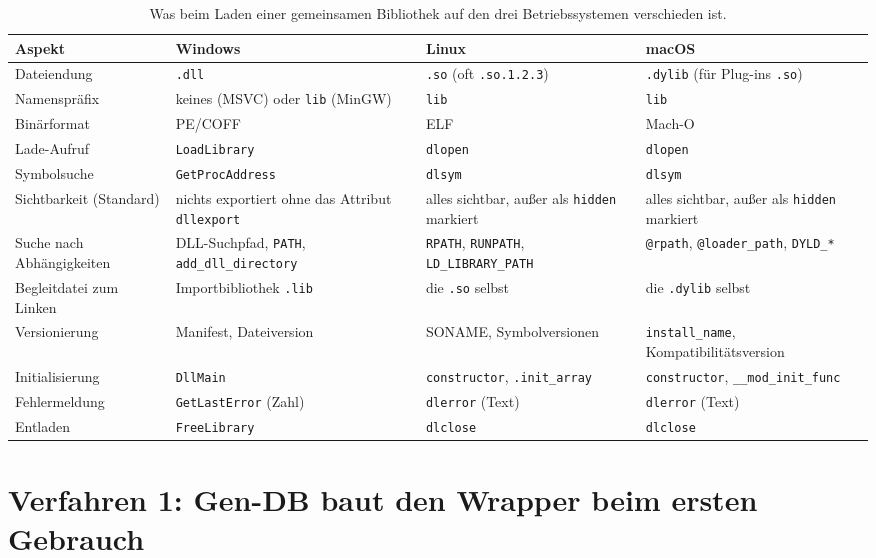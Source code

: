 \begin{table}[!ht]
	\centering
	\small
	\begin{tabularx}{\textwidth}{@{}L{2.9cm}L{3.5cm}L{3.5cm}Y@{}}
		\toprule
		Aspekt & Windows & Linux & macOS \\
		\midrule
		Dateiendung & \texttt{.dll} & \texttt{.so} (oft \texttt{.so.1.2.3}) & \texttt{.dylib} (für Plug-ins \texttt{.so}) \\[0.3em]
		Namenspräfix & keines (MSVC) oder \texttt{lib} (MinGW) & \texttt{lib} & \texttt{lib} \\[0.3em]
		Binärformat & PE/COFF & ELF & Mach-O \\[0.3em]
		Lade-Aufruf & \texttt{LoadLibrary} & \texttt{dlopen} & \texttt{dlopen} \\[0.3em]
		Symbolsuche & \texttt{GetProcAddress} & \texttt{dlsym} & \texttt{dlsym} \\[0.3em]
		Sichtbarkeit (Standard) & nichts exportiert ohne das Attribut \texttt{dllexport} & alles sichtbar, außer als \texttt{hidden} markiert & alles sichtbar, außer als \texttt{hidden} markiert \\[0.3em]
		Suche nach Abhängigkeiten & DLL-Suchpfad, \texttt{PATH}, \texttt{add\_dll\_directory} & \texttt{RPATH}, \texttt{RUNPATH}, \texttt{LD\_LIBRARY\_PATH} & \texttt{@rpath}, \texttt{@loader\_path}, \texttt{DYLD\_*} \\[0.3em]
		Begleitdatei zum Linken & Importbibliothek \texttt{.lib} & die \texttt{.so} selbst & die \texttt{.dylib} selbst \\[0.3em]
		Versionierung & Manifest, Dateiversion & SONAME, Symbolversionen & \texttt{install\_name}, Kompatibilitätsversion \\[0.3em]
		Initialisierung & \texttt{DllMain} & \texttt{constructor}, \texttt{.init\_array} & \texttt{constructor}, \texttt{\_\_mod\_init\_func} \\[0.3em]
		Fehlermeldung & \texttt{GetLastError} (Zahl) & \texttt{dlerror} (Text) & \texttt{dlerror} (Text) \\[0.3em]
		Entladen & \texttt{FreeLibrary} & \texttt{dlclose} & \texttt{dlclose} \\
		\bottomrule
	\end{tabularx}
	\caption{Was beim Laden einer gemeinsamen Bibliothek auf den drei Betriebssystemen verschieden ist.}
	\label{tab:laden_os}
\end{table}

\section{Verfahren 1: Gen-DB baut den Wrapper beim ersten Gebrauch}
\label{sec:laden_gendb}

